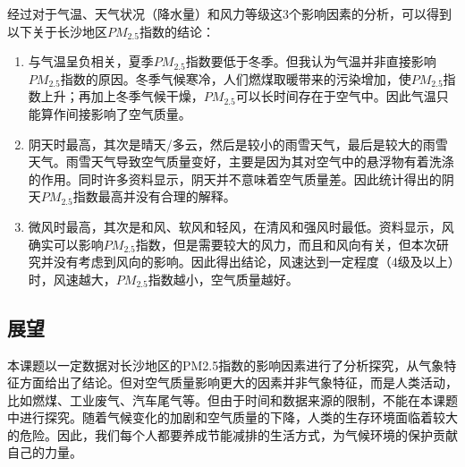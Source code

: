 \documentclass[UTF8,a4paper,10pt]{article}
\begin{document}
\indent 经过对于气温、天气状况（降水量）和风力等级这3个影响因素的分析，可以得到以下关于长沙地区$PM_{2.5}$指数的结论：
\begin{enumerate}
    \item 与气温呈负相关，夏季$PM_{2.5}$指数要低于冬季。但我认为气温并非直接影响$PM_{2.5}$指数的原因。冬季气候寒冷，人们燃煤取暖带来的污染增加，使$PM_{2.5}$指数上升；再加上冬季气候干燥，$PM_{2.5}$可以长时间存在于空气中。因此气温只能算作间接影响了空气质量。
    \item 阴天时最高，其次是晴天/多云，然后是较小的雨雪天气，最后是较大的雨雪天气。雨雪天气导致空气质量变好，主要是因为其对空气中的悬浮物有着洗涤的作用。同时许多资料\supercite{ref6}\supercite{ref7}显示，阴天并不意味着空气质量差。因此统计得出的阴天$PM_{2.5}$指数最高并没有合理的解释。
    \item 微风时最高，其次是和风、软风和轻风，在清风和强风时最低。资料\supercite{ref8}\supercite{ref9}显示，风确实可以影响$PM_{2.5}$指数，但是需要较大的风力，而且和风向有关，但本次研究并没有考虑到风向的影响。因此得出结论，风速达到一定程度（4级及以上）时，风速越大，$PM_{2.5}$指数越小，空气质量越好。
\end{enumerate}

\subsection{展望}

\indent 本课题以一定数据对长沙地区的PM2.5指数的影响因素进行了分析探究，从气象特征方面给出了结论。但对空气质量影响更大的因素并非气象特征，而是人类活动，比如燃煤、工业废气、汽车尾气等。但由于时间和数据来源的限制，不能在本课题中进行探究。随着气候变化的加剧和空气质量的下降，人类的生存环境面临着较大的危险。因此，我们每个人都要养成节能减排的生活方式，为气候环境的保护贡献自己的力量。
\end{document}
